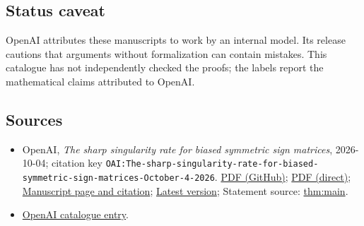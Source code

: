 \documentclass[11pt]{article}
\begin{document}
\subsection{Status caveat}
OpenAI attributes these manuscripts to work by an internal model. Its release cautions that arguments without formalization can contain mistakes. This catalogue has not independently checked the proofs; the labels report the mathematical claims attributed to OpenAI.

\subsection{Sources}
\begin{itemize}
\item OpenAI, \emph{The sharp singularity rate for biased symmetric sign matrices}, 2026-10-04; citation key \texttt{OAI:The-sharp-singularity-rate-for-biased-symmetric-sign-matrices-October-4-2026}. \href{https://github.com/openai/math/blob/adc7f1241b42e322a6451854ab7e4b4c146bf78a/preprints/The-sharp-singularity-rate-for-biased-symmetric-sign-matrices-October-4-2026/biased-symmetric-sign-singularity.pdf}{PDF (GitHub)}; \href{https://github.com/openai/math/raw/adc7f1241b42e322a6451854ab7e4b4c146bf78a/preprints/The-sharp-singularity-rate-for-biased-symmetric-sign-matrices-October-4-2026/biased-symmetric-sign-singularity.pdf}{PDF (direct)}; \href{https://github.com/openai/math/blob/adc7f1241b42e322a6451854ab7e4b4c146bf78a/preprints/The-sharp-singularity-rate-for-biased-symmetric-sign-matrices-October-4-2026/README.md}{Manuscript page and citation}; \href{https://github.com/openai/math/blob/main/preprints/The-sharp-singularity-rate-for-biased-symmetric-sign-matrices-October-4-2026/biased-symmetric-sign-singularity.pdf}{Latest version}; Statement source: \href{https://github.com/openai/math/blob/adc7f1241b42e322a6451854ab7e4b4c146bf78a/preprints/The-sharp-singularity-rate-for-biased-symmetric-sign-matrices-October-4-2026/build/sections/01-introduction.tex\#L12}{thm:main}.
\item \href{https://github.com/openai/math/blob/adc7f1241b42e322a6451854ab7e4b4c146bf78a/CONTENTS.md}{OpenAI catalogue entry}.
\end{itemize}
\end{document}
